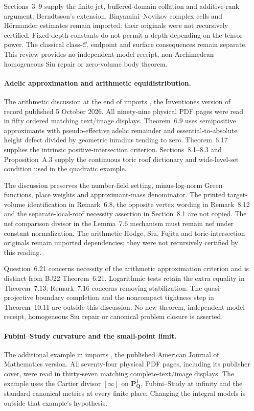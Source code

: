 Sections~3--9 supply the finite-jet, buffered-domain collation and
additive-rank argument. Berndtsson's extension, Binyamini--Novikov
complex cells and H\"ormander estimates remain imported; their
originals were not recursively certified. Fixed-depth constants do
not permit a depth depending on the tensor power. The classical
class-\(\mathcal C\), endpoint and surface consequences remain
separate. This review provides no independent-model receipt,
non-Archimedean homogeneous Siu repair or zero-volume body theorem.

\paragraph{Adelic approximation and arithmetic equidistribution.}
The arithmetic discussion at the end of
 imports
\cite{BallaySombra26Published}, the Inventiones version of record
published 5 October 2026. All ninety-nine physical PDF pages were
read in fifty ordered matching text/image displays. Theorem~6.9
uses semipositive approximants with pseudo-effective adelic remainder
and essential-to-absolute height defect divided by geometric
inradius tending to zero. Theorem~6.17 supplies the intrinsic
positive-intersection criterion. Sections~8.1--8.3 and
Proposition~A.3 supply the continuous toric roof dictionary and
wide-level-set condition used in the quadratic example.

The discussion preserves the number-field setting, minus-log-norm
Green functions, place weights and approximant-mass denominator.
The printed target-volume identification in Remark~6.8, the
opposite vertex wording in Remark~8.12 and the separate-local-roof
necessity assertion in Section~8.1 are not copied. The nef
comparison divisor in the Lemma~7.6 mechanism must remain nef
under constant normalization. The arithmetic Hodge, Siu, Fujita
and toric-intersection originals remain imported dependencies;
they were not recursively certified by this reading.

Question~6.21 concerns necessity of the arithmetic approximation
criterion and is distinct from BJ22 Theorem~6.21. Logarithmic tests
retain the extra equality in Theorem~7.13; Remark~7.16 concerns
removing stabilization. The quasi-projective boundary completion
and the noncompact tightness step in Theorem~10.11 are outside
this discussion. No new theorem, independent-model receipt,
homogeneous Siu repair or canonical problem closure is asserted.

\paragraph{Fubini--Study curvature and the small-point limit.}
The additional example in  imports
\cite[Theorem~6.4 and Example~6.5]{BGPRS19Published}, the published
American Journal of Mathematics version. All seventy-four physical
PDF pages, including its publisher cover, were read in thirty-seven
matching complete-text/image displays. The example uses the Cartier
divisor $[\infty]$ on $\mathbf P^1_{\mathbf Q}$, Fubini--Study at
infinity and the standard canonical metrics at every finite place.
Changing the integral models is outside that example's hypothesis.

